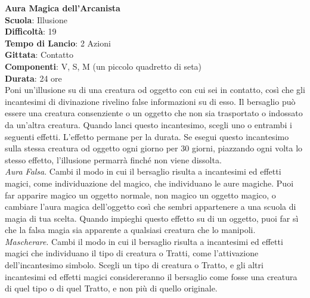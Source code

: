 \begin{multicols}{2}
\medskip\textbf{Aura Magica dell'Arcanista}\\
\textbf{Scuola}: Illusione\\
\textbf{Difficoltà}: 19\\
\textbf{Tempo di Lancio}: 2 Azioni\\
\textbf{Gittata}: Contatto\\
\textbf{Componenti}: V, S, M (un piccolo quadretto di seta)\\
\textbf{Durata}: 24 ore\\
Poni un'illusione su di una creatura od oggetto con cui sei in contatto, così che gli incantesimi di divinazione rivelino false informazioni su di esso. Il bersaglio può essere una creatura consenziente o un oggetto che non sia trasportato o indossato da un'altra creatura. Quando lanci questo incantesimo, scegli uno o entrambi i seguenti effetti. L'effetto permane per la durata. Se esegui questo incantesimo sulla stessa creatura od oggetto ogni giorno per 30 giorni, piazzando ogni volta lo stesso effetto, l'illusione permarrà finché non viene dissolta.\\
\textit{Aura Falsa}. Cambi il modo in cui il bersaglio risulta a incantesimi ed effetti magici, come individuazione del magico, che individuano le aure magiche. Puoi far apparire magico un oggetto normale, non magico un oggetto magico, o cambiare l'aura magica dell'oggetto così che sembri appartenere a una scuola di magia di tua scelta. Quando impieghi questo effetto su di un oggetto, puoi far sì che la falsa magia sia apparente a qualsiasi creatura che lo manipoli.\\ \textit{Mascherare}. Cambi il modo in cui il bersaglio risulta a incantesimi ed effetti magici che individuano il tipo di creatura o Tratti, come l'attivazione dell'incantesimo simbolo. Scegli un tipo di creatura o Tratto, e gli altri incantesimi ed effetti magici considereranno il bersaglio come fosse una creatura di quel tipo o di quel Tratto, e non più di quello originale.


\end{multicols}
